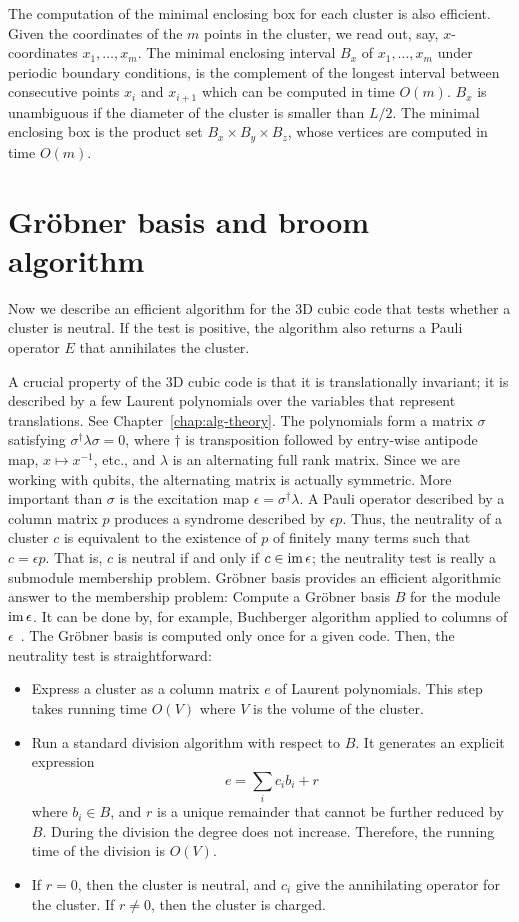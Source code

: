 The computation of the minimal enclosing box for each cluster is also efficient.
Given the coordinates of the $m$ points in the cluster,
we read out, say, $x$-coordinates $x_1,\ldots,x_m$.
The minimal enclosing interval $B_x$ of $x_1,\ldots,x_m$ under periodic boundary conditions,
is the complement of the longest interval between consecutive points $x_i$ and $x_{i+1}$
which can be computed in time $O(m)$.
$B_x$ is unambiguous if the diameter of the cluster is smaller than $L/2$.
The minimal enclosing box is the product set $B_x \times B_y \times B_z$,
whose vertices are computed in time $O(m)$.

\section{Gr\"obner basis and broom algorithm}
\label{subs:broom}

Now we describe an efficient algorithm for the 3D cubic code
that tests whether a cluster is neutral. If the test is positive,
the algorithm also returns a
Pauli operator $E$ that annihilates the cluster.

A crucial property of the 3D cubic code is
that it is translationally invariant;
it is described by a few Laurent polynomials 
over the variables that represent translations.
See Chapter~\ref{chap:alg-theory}.
The polynomials form a matrix $\sigma$ satisfying $\sigma^\dagger \lambda \sigma = 0$,
where $\dagger$ is transposition followed by entry-wise antipode map,
$x \mapsto x^{-1}$, etc., and $\lambda$ is an alternating full rank matrix.
Since we are working with qubits, the alternating matrix is actually symmetric.
More important than $\sigma$ is the excitation map $\epsilon = \sigma^\dagger \lambda$.
A Pauli operator described by a column matrix $p$ produces a syndrome described by $\epsilon p$.
Thus, the neutrality of a cluster $c$ is equivalent to the existence of $p$ of finitely many terms
such that $c = \epsilon p$.
That is, $c$ is neutral if and only if $c \in \mathop{\mathrm{im}}\nolimits \epsilon$;
the neutrality test is really a submodule membership problem.
Gr\"obner basis provides an efficient algorithmic answer to the membership problem:
Compute a Gr\"obner basis $B$ for the module $\mathop{\mathrm{im}}\nolimits \epsilon$.
It can be done by, for example, Buchberger algorithm applied to columns of $\epsilon$~\cite{PauerUnterkircher1999}.
The Gr\"obner basis is computed only once for a given code.
Then, the neutrality test is straightforward:
\begin{itemize}
\item[(1)] Express a cluster as a column matrix $e$ of Laurent polynomials.
This step takes running time $O(V)$ where $V$ is the volume of the cluster.
\item[(2)] Run a standard division algorithm with respect to $B$.
It generates an explicit expression
\[
 e = \sum_i c_i b_i + r
\]
where $b_i \in B$, and $r$ is a unique remainder that cannot be further reduced by $B$.
During the division the degree does not increase.
Therefore, the running time of the division is $O(V)$.
\item[(3)] If $r = 0$, then the cluster is neutral, and $c_i$ give the annihilating operator for the cluster.
If $r \neq 0$, then the cluster is charged.
\end{itemize}

